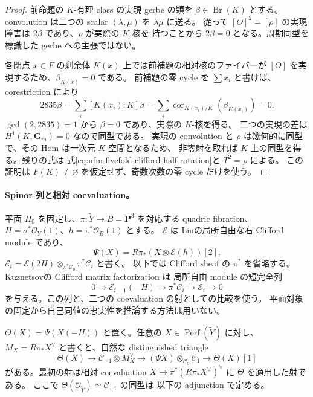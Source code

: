 \begin{proof}
前命題の $K$-有理 class の実現 gerbe の類を $\beta\in\operatorname{Br}(K)$ とする。
convolution は二つの scalar $(\lambda,\mu)$ を $\lambda\mu$ に送る。
従って $[O]^2=[\rho]$ の実現障害は $2\beta$ であり、$\rho$ が実際の $K$-核を
持つことから $2\beta=0$ となる。周期同型を標識した gerbe への主張ではない。

各閉点 $x\in F$ の剰余体 $K(x)$ 上では前補題の相対核のファイバーが
$[O]$ を実現するため、$\beta_{K(x)}=0$ である。
前補題の零 cycle を $\sum x_i$ と書けば、corestriction により
\[
 2835\beta=\sum_i[K(x_i):K]\beta
          =\sum_i\operatorname{cor}_{K(x_i)/K}(\beta_{K(x_i)})=0.
\]
$\gcd(2,2835)=1$ から $\beta=0$ であり、実際の $K$-核を得る。
二つの実現の差は $H^1(K,\mathbf G_m)=0$ なので同型である。
実現の convolution と $\rho$ は幾何的に同型で、その Hom は一次元 $K$-空間となるため、
非零射を取れば $K$ 上の同型を得る。残りの式は
式\eqref{eq:nfm-fivefold-clifford-half-rotation}と $T^2=\rho$ による。
この証明は $F(K)\ne\varnothing$ を仮定せず、奇数次数の零 cycle だけを使う。
\end{proof}

\paragraph{Spinor 列と相対 coevaluation。}
平面 $\Pi_0$ を固定し、$\pi:\widetilde Y\to B=\mathbf P^3$ を対応する quadric fibration、
$H=\sigma^*\mathcal O_Y(1)$、$h=\pi^*\mathcal O_B(1)$ とする。
$\mathcal E$ は Liu\cite[式~(2-4)]{NFMPeizeLiuFivefold}の局所自由な右 Clifford module であり、
\[
 \Psi(X)=R\pi_*(X\otimes\mathcal E(h))[2].
\]
$\mathcal E_i=\mathcal E(2H)\otimes_{\pi^*\mathcal C_0}\pi^*\mathcal C_i$ と書く。
以下では Clifford sheaf の $\pi^*$ を省略する。
Kuznetsov\cite[Lemmas~4.5, 4.7]{NFMKuznetsovQuadric}の Clifford matrix factorization は
局所自由 module の短完全列
\begin{equation}\label{eq:nfm-fivefold-spinor-two-sequence}
 0\longrightarrow\mathcal E_{i-1}(-H)
 \longrightarrow\pi^*\mathcal C_i
 \longrightarrow\mathcal E_i\longrightarrow0
\end{equation}
を与える。この列と、二つの coevaluation の射としての比較を使う。
平面対象の固定から自己同値の忠実性を推論する方法は用いない。

\begin{lemma}
\label{lem:nfm-fivefold-spinor-relative-coevaluation}
$\Theta(X)=\Psi(X(-H))$ と置く。任意の $X\in\operatorname{Perf}(\widetilde Y)$ に対し、
$M_X=R\pi_*X^\vee$ と書くと、自然な distinguished triangle
\begin{equation}\label{eq:nfm-fivefold-relative-coevaluation-triangle}
 \Theta(X)\longrightarrow
 \mathcal C_{-1}\otimes M_X^\vee\longrightarrow
 (\Psi X)\otimes_{\mathcal C_0}\mathcal C_1\longrightarrow\Theta(X)[1]
\end{equation}
がある。最初の射は相対 coevaluation
$X\to\pi^*(R\pi_*X^\vee)^\vee$ に $\Theta$ を適用した射である。
ここで $\Theta(\mathcal O_{\widetilde Y})\simeq\mathcal C_{-1}$ の同型は
以下の adjunction で定める。
\end{lemma}

